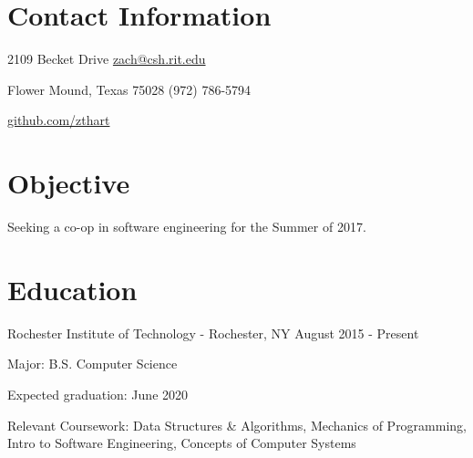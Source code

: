 \documentclass[margin,line]{resume}
\newcommand{\rurl}[1]{\hfill {\footnotesize \url{#1}}}
\newcommand{\rdate}[1]{\hfill {\small #1}}
\begin{document}
\begin{resume}
\section{\mysidestyle Contact Information} 
	\begin{asparablank}
		\item 2109 Becket Drive  \hfill \href{mailto:zach@csh.rit.edu}{zach@csh.rit.edu}
		\item Flower Mound, Texas 75028 \hfill (972) 786-5794
		\item \hfill \rurl{github.com/zthart}
    \end{asparablank}

\section{\mysidestyle Objective}
	\begin{asparablank}
    	\item Seeking a co-op in software engineering for the Summer of 2017.
        \normalsize
        \\
	\end{asparablank}

\section{\mysidestyle Education}
	\begin{compactdesc}
		\item[Rochester Institute of Technology] - Rochester, NY \rdate{August 2015 - Present}
		\begin{compactitem} { \small
			\item Major: B.S. Computer Science
			\item Expected graduation: June 2020
            \item Relevant Coursework: Data Structures \& Algorithms, Mechanics of Programming, Intro to Software Engineering, Concepts of Computer Systems
		} \end{compactitem}
	\end{compactdesc}


\end{resume}
\end{document}
